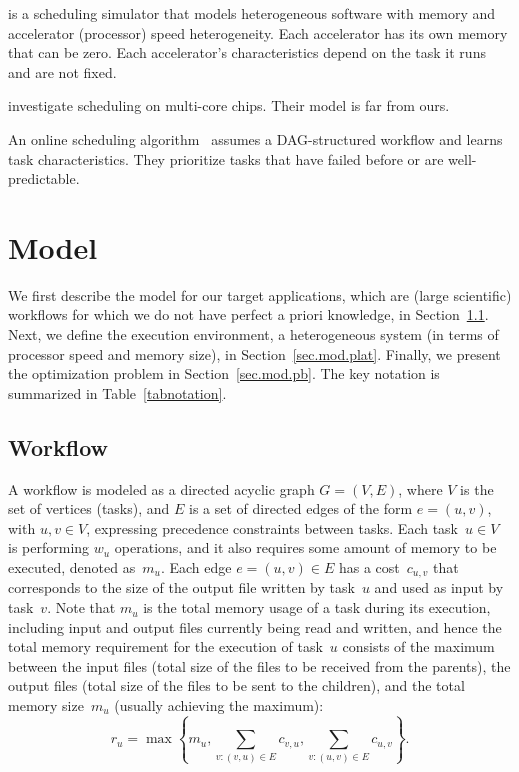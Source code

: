 \documentclass[conference]{IEEEtran}
\newcommand{\skug}[1]{{\color{blue}[SK: #1]}}
\begin{document}
    \cite{lutke2024hetsim} is a scheduling simulator that models heterogeneous software with memory and accelerator
    (processor) speed heterogeneity.
    Each accelerator has its own memory that can be zero.
    Each accelerator's characteristics depend on the task it runs and are not fixed.




    \cite{meng2018traffic} investigate scheduling on multi-core chips.
    Their model is far from ours.


    An online scheduling algorithm~\cite{Witt2018POS} assumes a DAG-structured workflow and learns task characteristics.
    They prioritize tasks that have failed before or are well-predictable.









    \section{Model} %

    We first describe the model for our target applications, which are (large scientific) workflows for which we do not have perfect a priori knowledge,
    in Section~\ref{sec.mod.work}.  Next, we define the execution
    environment, a heterogeneous system (in terms of processor speed and memory size),
    in Section~\ref{sec.mod.plat}. Finally, we present the optimization problem in
    Section~\ref{sec.mod.pb}. The key notation is summarized in Table~\ref{tabnotation}.

    \subsection{Workflow}
    \label{sec.mod.work}
    A workflow is modeled as a directed acyclic graph $G=(V, E)$, where $V$ is the set of vertices (tasks), and
    $E$ is a set of directed edges of the form $e=(u,v)$, with $u,v\in V$, expressing precedence constraints between tasks.
    Each task~$u \in V$  is performing $w_u$ operations, and it also
    requires some amount of memory to be executed, denoted as~$m_u$.
    Each edge $e=(u,v) \in E$ has a cost~$c_{u,v}$ that corresponds to the size of the output file written by task~$u$ and used as input by task~$v$.
   Note that $m_u$ is the total memory usage
    of a task during its execution, including input and output files currently being read and written,
    and hence the total memory requirement  for the execution of task~$u$ consists of the maximum
    between the input files
    (total size of the files to be received from the parents),
    the output files (total size of the files to be sent to the children),
    and the total memory size~$m_u$ (usually achieving the maximum):
    \[
        r_u = \max\left\{m_u , \sum_{v:(v,u)\in E}c_{v,u}, \sum_{v:(u,v)\in E} c_{u,v}\right\}.
    \]
\end{document}
